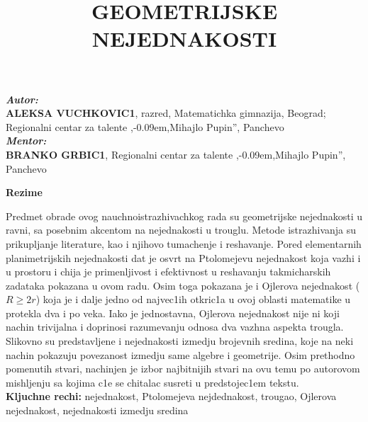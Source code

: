 \documentclass[11pt]{article}
\date{}
\title{\textbf{\huge GEOMETRIJSKE NEJEDNAKOSTI\\ \texteng{GEOMETRIC INEQUALITIES}}}
\newcommand\texteng{\fontencoding{OT1}\fontfamily{\rmdefault}\selectfont}
\def \zn{,\kern-0.09em,}
\begin{document}
\maketitle
\begin{center}
\vspace{-2cm}
\textbf{\emph{Autor:}}\\  \textbf{ALEKSA VUCHKOVIC1}, \text{\texteng{I}} razred, Matematichka gimnazija, Beograd; Regionalni centar za talente  \zn Mihajlo Pupin'', Panchevo\\[10mm]

\textbf{\emph{Mentor:}}\\ \textbf{BRANKO GRBIC1}, Regionalni centar za talente  \zn Mihajlo Pupin'', Panchevo\\[10mm]
\end{center}
\begin{center}
\LARGE\textbf{Rezime}
\end{center}
\begin{flushleft}
\normalsize
Predmet obrade ovog nauchnoistrazhivachkog rada su geometrijske nejednakosti u ravni, sa posebnim akcentom na nejednakosti u trouglu. Metode istrazhivanja su prikupljanje literature, kao i njihovo tumachenje i reshavanje. Pored elementarnih planimetrijskih nejednakosti dat je osvrt na Ptolomejevu nejednakost koja vazhi i u prostoru i chija je primenljivost i efektivnost u reshavanju takmicharskih zadataka pokazana u ovom radu. Osim toga pokazana je i Ojlerova nejednakost ($R\geq 2r$) koja je i dalje jedno od najvec1ih otkric1a u ovoj oblasti matematike u protekla dva i po veka. Iako je jednostavna, Ojlerova nejednakost nije ni koji nachin trivijalna i doprinosi razumevanju odnosa dva vazhna aspekta trougla. Slikovno su predstavljene i nejednakosti izmedju brojevnih sredina, koje na neki nachin pokazuju povezanost izmedju same algebre i geometrije. Osim prethodno pomenutih stvari,  nachinjen je izbor najbitnijih stvari na ovu temu po autorovom mishljenju sa kojima c1e se chitalac susreti u predstojec1em tekstu.\\
\vspace{0.5cm}
\textbf{Kljuchne rechi:} nejednakost, Ptolomejeva nejdednakost, trougao, Ojlerova nejednakost, nejednakosti izmedju sredina
\end{flushleft}
\begin{center}
    \LARGE\textbf{\texteng{Summary}}
\end{center}
\end{document}
